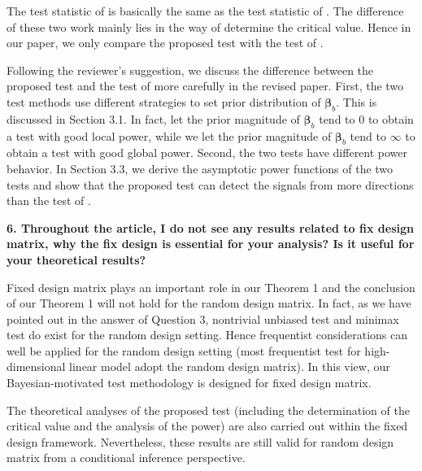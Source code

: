 \documentclass[11pt]{article}
\newcommand{\bfsym}[1]{\ensuremath{\boldsymbol{#1}}}
\def\bbeta{\bfsym \beta}
\theoremstyle{plain}
\theoremstyle{definition}
\theoremstyle{remark}
\begin{document}
The test statistic of \cite{Lan2014Testing} is basically the same as the test statistic of \cite{Goeman2006}.
The difference of these two work mainly lies in the way of determine the critical value.
Hence in our paper, we only compare the proposed test with the test of \cite{Goeman2006}.

Following the reviewer's suggestion, we discuss the difference between the proposed test and the test of \cite{Goeman2006} more carefully in the revised paper.
First, the two test methods use different strategies to set prior distribution of $\bbeta_b$.
This is discussed in Section 3.1.
In fact, \cite{Goeman2006} let the prior magnitude of $\bbeta_b$ tend to $0$ to obtain a test with good local power,
while we let the prior magnitude of $\bbeta_b$ tend to $\infty$ to obtain a test with good global power.
Second, the two tests have different power behavior.
In Section 3.3, we derive the asymptotic power functions of the two tests and show that the proposed test can detect the signals from more directions than the test of \cite{Goeman2006}.

\textbf{
    6. Throughout the article, I do not see any results related to fix design matrix, why the fix design is essential for your analysis?
    Is it useful for your theoretical results?
}

Fixed design matrix plays an important role in our Theorem 1 and the conclusion of our Theorem 1 will not hold for the random design matrix.
In fact, as we have pointed out in the answer of Question 3, nontrivial unbiased test and minimax test do exist for the random design setting.
Hence frequentist considerations can well be applied for the random design setting (most frequentist test for high-dimensional linear model adopt the random design matrix).
In this view, our Bayesian-motivated test methodology is designed for fixed design matrix.

The theoretical analyses of the proposed test (including the determination of the critical value and the analysis of the power) are also carried out within the fixed design framework.
Nevertheless, these results are still valid for random design matrix from a conditional inference perspective.
\end{document}
